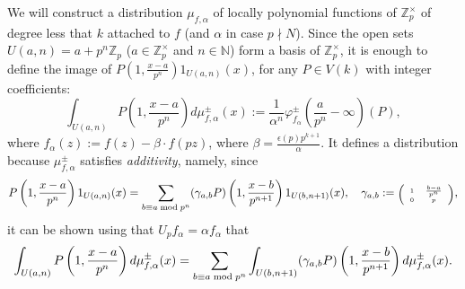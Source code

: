 \documentclass{amsart}
\newcommand{\Z}{{\mathbb Z}}
\newcommand{\N}{{\mathbb N}}
\begin{document}
We will construct a distribution $\mu_{f,\alpha}$ of locally polynomial functions of $\Z_p^\times$ of degree less that $k$ attached to $f$ (and $\alpha$ in case $p\nmid N$). Since the open sets $U(a,n)=a+p^n\Z_p$ ($a\in \Z_p^\times$ and $n\in \N$) form a basis of $\Z_p^\times$, it is enough to define the image of $P\left(1,\frac{x-a}{p^n}\right)1_{U(a,n)}(x)$, for any $P\in V(k)$ with integer coefficients:
\begin{equation}\label{eqclassmu}
\int_{U(a,n)}P\left(1,\frac{x-a}{p^n}\right)d\mu^\pm_{f,\alpha}(x):=\frac{1}{\alpha^n}\varphi^\pm_{f_\alpha}\left(\frac{a}{p^n}-\infty\right)(P),
\end{equation}
where $f_{\alpha}(z):=f(z)-\beta\cdot f(pz)$, where $\beta=\frac{\epsilon(p)p^{k+1}}{\alpha}$.
It defines a distribution because $\mu^\pm_{f,\alpha}$ satisfies \emph{additivity}, namely, since 
\[
P\left(1,\frac{x-a}{p^n}\right)1_{U(a,n)}(x)=%
\sum_{b\equiv a\;{\rm mod} \;p^{n}} (\gamma_{a,b}P)\left(1,\frac{x-b}{p^{n+1}}\right)1_{U(b,n+1)}(x),\quad\gamma_{a,b}:=\mbox{\tiny$\left(\begin{array}{cc}1&\frac{b-a}{p^n}\\0&p\end{array}\right)$},
\]
it can be shown using that $U_p f_\alpha=\alpha f_\alpha$ that 
\[
\int_{U(a,n)}P\left(1,\frac{x-a}{p^n}\right)d\mu^\pm_{f,\alpha}(x)=%
\sum_{b\equiv a\;{\rm mod} \;p^{n}}\int_{U(b,n+1)} (\gamma_{a,b}P)\left(1,\frac{x-b}{p^{n+1}}\right)d\mu^\pm_{f,\alpha}(x).
\]
\end{document}
